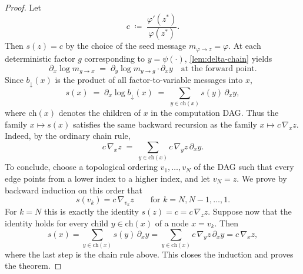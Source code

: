 \documentclass[12pt]{article}
\newcommand{\1}{\mathbb{1}}
\renewcommand{\phi}{\varphi}
\newcommand{\defeq}{\coloneq}
\theoremstyle{definition}
\begin{document}
\begin{proof}
Let
\[
c\;\defeq\;\frac{\phi'(z^*)}{\phi(z^*)}.
\]
Then $s(z)=c$ by the choice of the seed message $m_{\phi\to z}=\phi$. At each deterministic factor $g$ corresponding to $y=\psi(\cdot)$,
\cref{lem:delta-chain} yields
\[
\partial_x\log m_{g\to x}
\;=\;
\partial_y\log m_{y\to g}\cdot \partial_x y
\quad\text{at the forward point}.
\]
Since $b_\downarrow(x)$ is the product of all factor-to-variable messages into $x$,
\[
s(x)
\;=\;
\partial_x\log b_\downarrow(x)
\;=\;
\sum_{y\in \mathrm{ch}(x)} s(y)\,\partial_x y,
\]
where $\mathrm{ch}(x)$ denotes the children of $x$ in the computation DAG. Thus the family $x\mapsto s(x)$ satisfies the same backward recursion as the family $x\mapsto c\,\nabla_x z$. Indeed, by the ordinary chain rule,
\[
c\,\nabla_x z
\;=\;
\sum_{y\in\mathrm{ch}(x)} c\,\nabla_y z\,\partial_x y.
\]
To conclude, choose a topological ordering $v_1,\dots,v_N$ of the DAG such that every edge points from a lower index to a higher index, and let $v_N=z$. We prove by backward induction on this order that
\[
s(v_k)=c\,\nabla_{v_k}z\qquad\text{for }k=N,N-1,\dots,1.
\]
For $k=N$ this is exactly the identity $s(z)=c=c\,\nabla_z z$. Suppose now that the identity holds for every child $y\in\mathrm{ch}(x)$ of a node $x=v_k$. Then
\[
s(x)
=
\sum_{y\in\mathrm{ch}(x)} s(y)\,\partial_x y
=
\sum_{y\in\mathrm{ch}(x)} c\,\nabla_y z\,\partial_x y
=
c\,\nabla_x z,
\]
where the last step is the chain rule above. This closes the induction and proves the theorem.
\end{proof}
\end{document}

